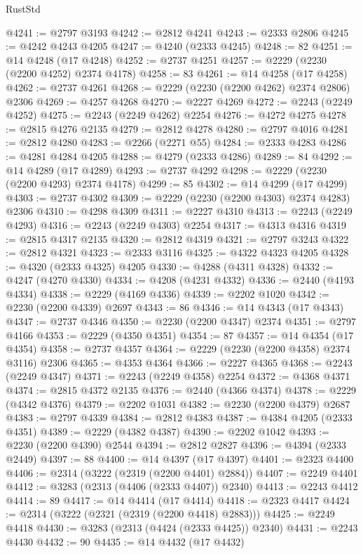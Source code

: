 \begin{lexlean}{RustStd}
\begin{coremodule}
@4241 := @2797 @3193
@4242 := @2812 @4241
@4243 := @2333 @2806
@4245 := @4242 @4243 @4205
@4247 := @4240 (@2333 @4245)
@4248 := 82
@4251 := @14 @4248 (@17 @4248)
@4252 := @2737 @4251
@4257 := @2229 (@2230 (@2200 @4252) @2374 @4178)
@4258 := 83
@4261 := @14 @4258 (@17 @4258)
@4262 := @2737 @4261
@4268 := @2229 (@2230 (@2200 @4262) @2374 @2806) @2306
@4269 := @4257 @4268
@4270 := @2227 @4269
@4272 := @2243 (@2249 @4252)
@4275 := @2243 (@2249 @4262) @2254
@4276 := @4272 @4275
@4278 := @2815 @4276 @2135
@4279 := @2812 @4278
@4280 := @2797 @4016
@4281 := @2812 @4280
@4283 := @2266 (@2271 @55)
@4284 := @2333 @4283
@4286 := @4281 @4284 @4205
@4288 := @4279 (@2333 @4286)
@4289 := 84
@4292 := @14 @4289 (@17 @4289)
@4293 := @2737 @4292
@4298 := @2229 (@2230 (@2200 @4293) @2374 @4178)
@4299 := 85
@4302 := @14 @4299 (@17 @4299)
@4303 := @2737 @4302
@4309 := @2229 (@2230 (@2200 @4303) @2374 @4283) @2306
@4310 := @4298 @4309
@4311 := @2227 @4310
@4313 := @2243 (@2249 @4293)
@4316 := @2243 (@2249 @4303) @2254
@4317 := @4313 @4316
@4319 := @2815 @4317 @2135
@4320 := @2812 @4319
@4321 := @2797 @3243
@4322 := @2812 @4321
@4323 := @2333 @3116
@4325 := @4322 @4323 @4205
@4328 := @4320 (@2333 @4325) @4205
@4330 := @4288 (@4311 @4328)
@4332 := @4247 (@4270 @4330)
@4334 := @4208 (@4231 @4332)
@4336 := @2440 (@4193 @4334)
@4338 := @2229 (@4169 @4336)
@4339 := @2202 @1020
@4342 := @2230 (@2200 @4339) @2697
@4343 := 86
@4346 := @14 @4343 (@17 @4343)
@4347 := @2737 @4346
@4350 := @2230 (@2200 @4347) @2374
@4351 := @2797 @4166
@4353 := @2229 (@4350 @4351)
@4354 := 87
@4357 := @14 @4354 (@17 @4354)
@4358 := @2737 @4357
@4364 := @2229 (@2230 (@2200 @4358) @2374 @3116) @2306
@4365 := @4353 @4364
@4366 := @2227 @4365
@4368 := @2243 (@2249 @4347)
@4371 := @2243 (@2249 @4358) @2254
@4372 := @4368 @4371
@4374 := @2815 @4372 @2135
@4376 := @2440 (@4366 @4374)
@4378 := @2229 (@4342 @4376)
@4379 := @2202 @1031
@4382 := @2230 (@2200 @4379) @2687
@4383 := @2797 @4339
@4384 := @2812 @4383
@4387 := @4384 @4205 (@2333 @4351)
@4389 := @2229 (@4382 @4387)
@4390 := @2202 @1042
@4393 := @2230 (@2200 @4390) @2544
@4394 := @2812 @2827
@4396 := @4394 (@2333 @2449)
@4397 := 88
@4400 := @14 @4397 (@17 @4397)
@4401 := @2323 @4400
@4406 := @2314 (@3222 (@2319 (@2200 @4401) @2884))
@4407 := @2249 @4401
@4412 := @3283 (@2313 (@4406 (@2333 @4407)) @2340)
@4413 := @2243 @4412
@4414 := 89
@4417 := @14 @4414 (@17 @4414)
@4418 := @2323 @4417
@4424 := @2314 (@3222 (@2321 (@2319 (@2200 @4418) @2883)))
@4425 := @2249 @4418
@4430 := @3283 (@2313 (@4424 (@2333 @4425)) @2340)
@4431 := @2243 @4430
@4432 := 90
@4435 := @14 @4432 (@17 @4432)

\end{coremodule}
\end{lexlean}
